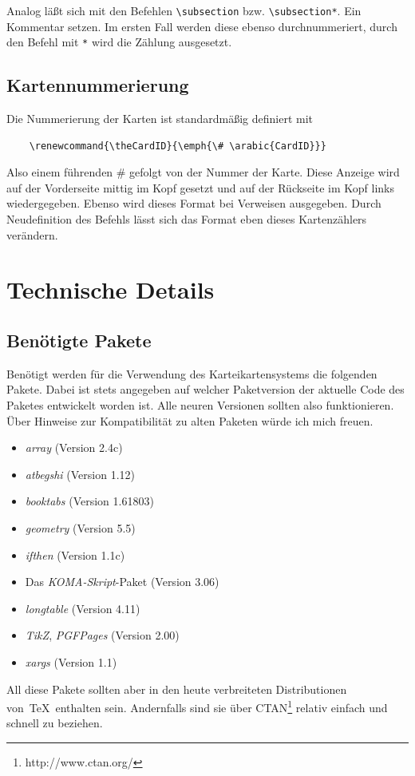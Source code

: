 \documentclass[a4paper,DIV=calc]{scrartcl}
\newcommand{\befehl}[1]{%
\marginpar{\footnotesize\textsf{#1}}%
}
\begin{document}
Analog läßt sich mit den Befehlen \lstinline!\subsection! bzw. \lstinline!\subsection*!. Ein Kommentar setzen. Im ersten Fall werden diese ebenso durchnummeriert, durch den Befehl mit \lstinline!*! wird die Zählung ausgesetzt.

\subsection{Kartennummerierung}
Die Nummerierung der Karten ist standardmäßig definiert mit \befehl{\textbackslash theCardID}
\begin{lstlisting}
	\renewcommand{\theCardID}{\emph{\# \arabic{CardID}}}
\end{lstlisting}
Also einem führenden \# gefolgt von der Nummer der Karte. Diese Anzeige wird auf der Vorderseite mittig im Kopf gesetzt und auf der Rückseite im Kopf links wiedergegeben. Ebenso wird dieses Format bei Verweisen ausgegeben. Durch Neudefinition des Befehls lässt sich das Format eben dieses Kartenzählers verändern.
%
%
%
\section{Technische Details}
\subsection{Benötigte Pakete}
Benötigt werden für die Verwendung des Karteikartensystems die folgenden Pakete. Dabei ist stets angegeben auf welcher Paketversion der aktuelle Code des Paketes entwickelt worden ist. Alle neuren Versionen sollten also funktionieren. Über Hinweise zur Kompatibilität zu alten Paketen würde ich mich freuen.
\begin{itemize}
	\item \emph{array} (Version 2.4c)
	\item \emph{atbegshi} (Version 1.12)
	\item \emph{booktabs} (Version 1.61803)
	\item \emph{geometry} (Version 5.5)
	\item \emph{ifthen} (Version 1.1c)
	\item Das \emph{KOMA-Skript}-Paket (Version 3.06)
	\item \emph{longtable} (Version 4.11)
	\item \emph{TikZ}, \emph{PGFPages} (Version 2.00)
	\item \emph{xargs} (Version 1.1)
\end{itemize}
All diese Pakete sollten aber in den heute verbreiteten Distributionen von\ \TeX\ enthalten sein. Andernfalls sind sie über CTAN\footnote{http://www.ctan.org/} relativ einfach und schnell zu beziehen.
\end{document}
